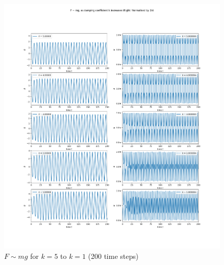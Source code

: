 \documentclass[10pt, twocolumn]{article}
\begin{document}
\begin{figure}[H]
    \centering
    \includegraphics[width = \columnwidth]{Projects/ForcedSimplePendulum/Plots/F~mg as damping coefficient k increases from 5 to 1 (med).png}
    \caption{$F \sim{mg}$ for $k = 5$ to $k = 1$ (200 time steps)}
    \label{k 5 to 1 med}
\end{figure}
\end{document}
